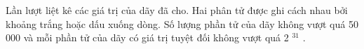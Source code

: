 Lần lượt liệt kê các giá trị của dãy đã cho. Hai phân tử được ghi cách nhau bởi khoảng trắng hoặc dấu xuống dòng. Số lượng phần tử của dãy không vượt quá 50 000 và mỗi phần tử của dãy có giá trị tuyệt đối không vượt quá 2   $^    31   $   .  

\